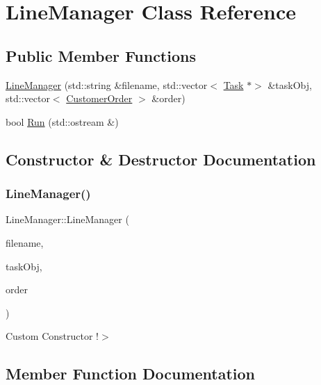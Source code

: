 \hypertarget{class_line_manager}{}\section{Line\+Manager Class Reference}
\label{class_line_manager}
\subsection*{Public Member Functions}
\begin{DoxyCompactItemize}
\item 
\mbox{\hyperlink{class_line_manager_a5e677efc34955d0e7fb7efdf57db3d32}{Line\+Manager}} (std\+::string \&filename, std\+::vector$<$ \mbox{\hyperlink{class_task}{Task}} $\ast$$>$ \&task\+Obj, std\+::vector$<$ \mbox{\hyperlink{class_customer_order}{Customer\+Order}} $>$ \&order)
\item 
bool \mbox{\hyperlink{class_line_manager_ad18c4a41e40fbfb89b6b218dfefa31ed}{Run}} (std\+::ostream \&)
\end{DoxyCompactItemize}


\subsection{Constructor \& Destructor Documentation}
\mbox{\label{class_line_manager_a5e677efc34955d0e7fb7efdf57db3d32}} 
\subsubsection{\texorpdfstring{Line\+Manager()}{LineManager()}}
{\footnotesize\ttfamily Line\+Manager\+::\+Line\+Manager (\begin{DoxyParamCaption}\item[{std\+::string \&}]{filename,  }\item[{std\+::vector$<$ \mbox{\hyperlink{class_task}{Task}} $\ast$$>$ \&}]{task\+Obj,  }\item[{std\+::vector$<$ \mbox{\hyperlink{class_customer_order}{Customer\+Order}} $>$ \&}]{order }\end{DoxyParamCaption})}

Custom Constructor !$>$ 

\subsection{Member Function Documentation}
\mbox{\label{class_line_manager_ad18c4a41e40fbfb89b6b218dfefa31ed}} 

